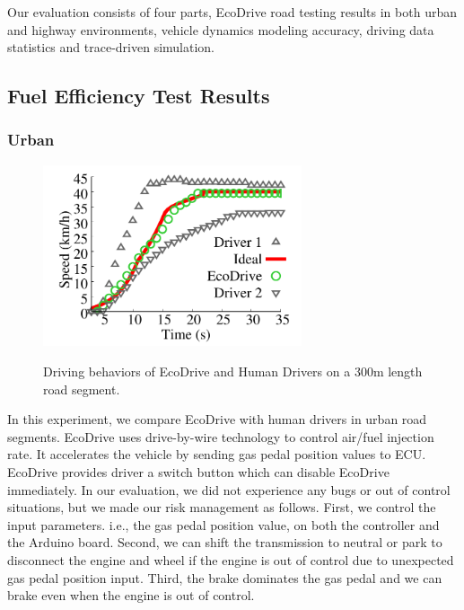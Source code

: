 
Our evaluation consists of four parts, EcoDrive road testing results in both urban and highway environments, 
vehicle dynamics modeling accuracy, 
driving data statistics and trace-driven simulation. 


\subsection{Fuel Efficiency Test Results}



\subsubsection{Urban}

\begin{figure}[!htbp]
\begin{center}
\includegraphics[width=3.0in,angle=0]{Figs/EcoDrive/evaluation/sampledrive240.pdf}
\vspace{-0.0cm}
\caption{Driving behaviors of EcoDrive and Human Drivers on a 300m length road segment.}
\vspace{-0.6cm}
\label{sampledrive}
\end{center}
\end{figure}


In this experiment, we compare EcoDrive with human drivers in urban
road segments.  
EcoDrive uses drive-by-wire technology to control air/fuel injection rate. 
It accelerates the vehicle by sending gas pedal position values to ECU. 
EcoDrive provides driver a switch button which can disable EcoDrive immediately. 
In our evaluation, we did not experience any bugs or out of control situations, 
but we made our risk management as follows. 
First, we control the input parameters. i.e., the gas pedal position value, 
on both the controller and the Arduino board. 
Second, we can shift the transmission to neutral or park to disconnect the engine and wheel
if the engine is out of control due to unexpected gas pedal position input. 
Third, the brake dominates the gas pedal and we can brake
even when the engine is out of control. 



